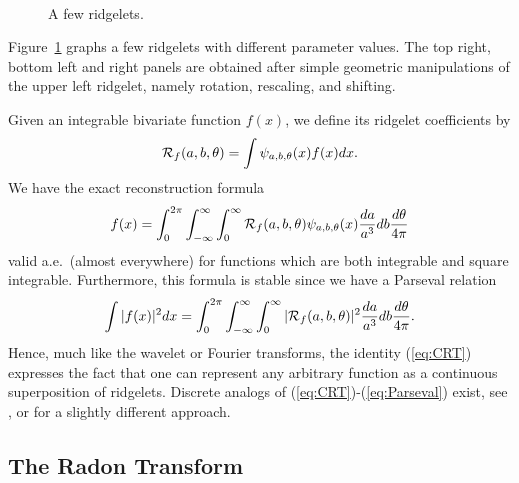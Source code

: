 \begin{figure}[htb]
\centerline{
\vbox{
\hbox{
}
\hbox{
}
}}
\caption{A few ridgelets.}
\label{fig_rid_function}
\end{figure}

Figure~\ref{fig_rid_function} graphs a few ridgelets with different
parameter values. The top right, bottom left and right panels
are obtained after simple geometric manipulations of the upper left
ridgelet, namely rotation, rescaling, and shifting.  

Given an
integrable bivariate function $f(x)$, we define its ridgelet
coefficients by
\[
{\cal R}_f(a,b,\theta) = \int \psi_{a,b,\theta}(x) f(x) dx.
\]
We have the exact reconstruction formula
\begin{equation}
\label{eq:CRT}
f(x) = \int_0^{2\pi} \int_{-\infty}^\infty \int_0^\infty
{\cal R}_f(a,b,\theta) {\psi}_{a,b,\theta}(x) \frac{da}{a^3} db
\frac{d\theta}{4\pi}
\end{equation}
valid a.e.\ (almost everywhere) 
for functions which are both integrable and square
integrable. Furthermore, this formula is stable since we have a Parseval
relation
\begin{equation}
\label{eq:Parseval}
       \int |f(x)|^2 dx = \int_0^{2\pi} \int_{-\infty}^\infty
\int_0^\infty
|{\cal R}_f(a,b,\theta)|^2 \frac{da}{a^3} db \frac{d\theta}{4\pi}.
\end{equation}
Hence, much like the wavelet or Fourier transforms, the identity
(\ref{eq:CRT}) expresses the fact that one can represent any arbitrary
function as a continuous superposition of ridgelets.  Discrete
analogs of (\ref{eq:CRT})-(\ref{eq:Parseval}) exist, see
\cite{Harmnet}, or \cite{Ortholinear} for a slightly different
approach.

\subsection{The Radon Transform}

